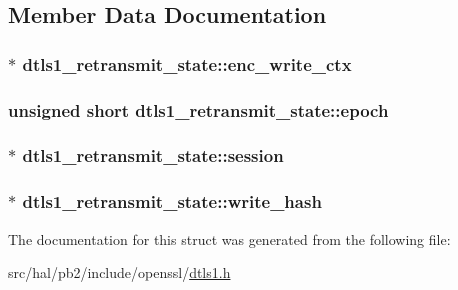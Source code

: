\subsection{Member Data Documentation}
\subsubsection[{\texorpdfstring{enc\+\_\+write\+\_\+ctx}{enc_write_ctx}}]{$\ast$ dtls1\+\_\+retransmit\+\_\+state\+::enc\+\_\+write\+\_\+ctx}\hypertarget{structdtls1__retransmit__state_ae1e9d630767c9f03cbbdf719fb84d05f}{}\label{structdtls1__retransmit__state_ae1e9d630767c9f03cbbdf719fb84d05f}
\subsubsection[{\texorpdfstring{epoch}{epoch}}]{\setlength{\rightskip}{0pt plus 5cm}unsigned short dtls1\+\_\+retransmit\+\_\+state\+::epoch}\hypertarget{structdtls1__retransmit__state_a8a8ac3e9aaaeee2fe91f54ad027f17a9}{}\label{structdtls1__retransmit__state_a8a8ac3e9aaaeee2fe91f54ad027f17a9}
\subsubsection[{\texorpdfstring{session}{session}}]{$\ast$ dtls1\+\_\+retransmit\+\_\+state\+::session}\hypertarget{structdtls1__retransmit__state_ad953293227cf8db42778e560516d160f}{}\label{structdtls1__retransmit__state_ad953293227cf8db42778e560516d160f}
\subsubsection[{\texorpdfstring{write\+\_\+hash}{write_hash}}]{$\ast$ dtls1\+\_\+retransmit\+\_\+state\+::write\+\_\+hash}\hypertarget{structdtls1__retransmit__state_aabb799421e4698d91594730ac7758f7a}{}\label{structdtls1__retransmit__state_aabb799421e4698d91594730ac7758f7a}


The documentation for this struct was generated from the following file\+:\begin{DoxyCompactItemize}
\item 
src/hal/pb2/include/openssl/\hyperlink{dtls1_8h}{dtls1.\+h}\end{DoxyCompactItemize}
